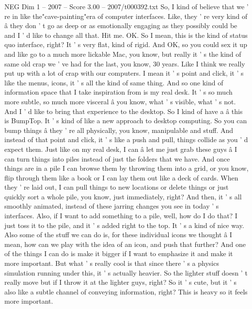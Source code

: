 \begin{textsample}{NEG Dim 1 – 2007 – Score 3.00 – 2007/t000392.txt}  \label{ex:f1_neg_061}
So, I kind of believe that we ' re in like the"cave-painting"era of computer interfaces.
Like, they ' re very kind of â they don ' t go as deep or as emotionally engaging as they possibly could be and I ' d like to change all that.
Hit me.
OK.
So I mean, this is the kind of status quo interface, right?
It ' s very flat, kind of rigid.
And OK, so you could sex it up and like go to a much more lickable Mac, you know, but really it ' s the kind of same old crap we ' ve had for the last, you know, 30 years.
Like I think we really put up with a lot of crap with our computers.
I mean it ' s point and click, it ' s like the menus, icons, it ' s all the kind of same thing.
And so one kind of information space that I take inspiration from is my real desk.
It ' s so much more subtle, so much more visceral â you know, what ' s visible, what ' s not.
And I ' d like to bring that experience to the desktop.
So I kind of have a â this is BumpTop.
It ' s kind of like a new approach to desktop computing.
So you can bump things â they ' re all physically, you know, manipulable and stuff.
And instead of that point and click, it ' s like a push and pull, things collide as you ' d expect them.
Just like on my real desk, I can â let me just grab these guys â I can turn things into piles instead of just the folders that we have.
And once things are in a pile I can browse them by throwing them into a grid, or you know, flip through them like a book or I can lay them out like a deck of cards.
When they ' re laid out, I can pull things to new locations or delete things or just quickly sort a whole pile, you know, just immediately, right?
And then, it ' s all smoothly animated, instead of these jarring changes you see in today ' s interfaces.
Also, if I want to add something to a pile, well, how do I do that?
I just toss it to the pile, and it ' s added right to the top.
It ' s a kind of nice way.
Also some of the stuff we can do is, for these individual icons we thought â I mean, how can we play with the idea of an icon, and push that further?
And one of the things I can do is make it bigger if I want to emphasize it and make it more important.
But what ' s really cool is that since there ' s a physics simulation running under this, it ' s actually heavier.
So the lighter stuff doesn ' t really move but if I throw it at the lighter guys, right?
So it ' s cute, but it ' s also like a subtle channel of conveying information, right?
This is heavy so it feels more important.

\end{textsample}
